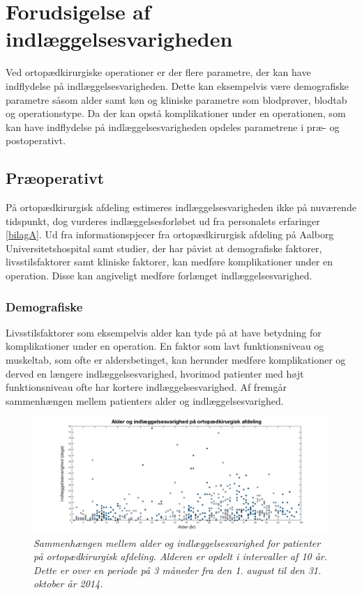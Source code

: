 \section{Forudsigelse af indlæggelsesvarigheden} \label{forudsig}
Ved ortopædkirurgiske operationer er der flere parametre, der kan have indflydelse på indlæggelsesvarigheden. Dette kan eksempelvis være demografiske parametre såsom alder samt køn og kliniske parametre som blodprøver, blodtab og operationstype. Da der kan opstå komplikationer under en operationen, som kan have indflydelse på indlæggelsesvarigheden opdeles parametrene i præ- og postoperativt.


\subsection{Præoperativt} \label{praeop}
På ortopædkirurgisk afdeling estimeres indlæggelsesvarigheden ikke på nuværende tidspunkt, dog vurderes indlæggelsesforløbet ud fra personalets erfaringer \ref{bilagA}. Ud fra informationspjecer fra ortopædkirurgisk afdeling på Aalborg Universitetshospital samt studier, der har påvist at demografiske faktorer, livsstilsfaktorer samt kliniske faktorer, kan medføre komplikationer under en operation\cite{Nordjylland2014}. Disse kan angiveligt medføre forlænget indlæggelsesvarighed.


\subsubsection{Demografiske}
Livsstilsfaktorer som eksempelvis alder kan tyde på at have betydning for komplikationer under en operation. En faktor som lavt funktionsniveau og muskeltab, som ofte er aldersbetinget, kan herunder medføre komplikationer og derved en længere indlæggelsesvarighed, hvorimod patienter med højt funktionsniveau ofte har kortere indlæggelsesvarighed.\cite{Kehlet2001, Janssen2002} Af  fremgår sammenhængen mellem patienters alder og indlæggelsesvarighed. 


\begin{figure}[H]
	\centering
	\includegraphics[scale=0.3]{figures/alderogindlaeg}
	\caption{\textit{Sammenhængen mellem alder og indlæggelsesvarighed for patienter på ortopædkirurgisk afdeling. Alderen er opdelt i intervaller af 10 år. Dette er over en periode på 3 måneder fra den 1. august til den 31. oktober år 2014.}}
	\label{alderogindlaeggelse}
\end{figure}


